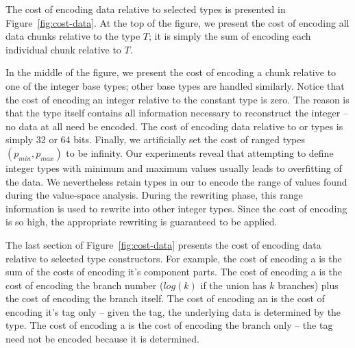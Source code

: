 The cost of encoding data relative to selected types is presented in 
Figure~\ref{fig:cost-data}.  At the top of the figure,
we present the cost of encoding all data
chunks relative to the type $T$; it is simply the sum of encoding
each individual chunk relative to $T$.  

In the middle of the figure,
we present the cost of encoding a chunk relative to one of the integer base 
types; other base types are handled similarly.  Notice that the cost of 
encoding an integer relative to the constant type  is
zero.  The reason is that the type itself contains all information
necessary to reconstruct the integer -- no data at all need be encoded.
The cost of encoding data relative to  or  types 
is simply 32 or 64 bits.  Finally, we artificially set the cost of
ranged types $(p_{min},p_{max})$ to be infinity.
Our experiments reveal that attempting to define integer types with
minimum and maximum values usually leads to overfitting of the data.
We nevertheless retain  types in our \ir{} to encode
the range of values found during the value-space analysis.  During the
rewriting phase, this range information is used to rewrite 
into other integer types.  Since the
cost of encoding  is so high, the appropriate rewriting is 
guaranteed to be applied.

The last section of Figure~\ref{fig:cost-data} presents the cost of
encoding data relative to selected type constructors.  For example,
the cost of encoding a  is the sum of the costs of encoding
it's component parts.  The cost of encoding a  is the cost
of encoding the branch number ($log(k)$ if the union has $k$ branches)
plus the cost of encoding the branch itself.  The cost of encoding
an  is the cost of encoding it's tag only -- given the tag,
the underlying data is determined by the type.  The cost of encoding
a  is the cost of encoding the branch only -- the tag need not
be encoded because it is determined.


